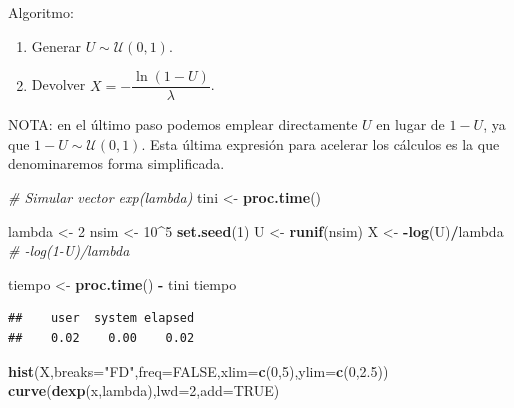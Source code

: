 \documentclass[]{book}
\newenvironment{Shaded}{\begin{snugshade}}{\end{snugshade}}
\newcommand{\KeywordTok}[1]{\textcolor[rgb]{0.13,0.29,0.53}{\textbf{#1}}}
\newcommand{\DataTypeTok}[1]{\textcolor[rgb]{0.13,0.29,0.53}{#1}}
\newcommand{\DecValTok}[1]{\textcolor[rgb]{0.00,0.00,0.81}{#1}}
\newcommand{\FloatTok}[1]{\textcolor[rgb]{0.00,0.00,0.81}{#1}}
\newcommand{\StringTok}[1]{\textcolor[rgb]{0.31,0.60,0.02}{#1}}
\newcommand{\CommentTok}[1]{\textcolor[rgb]{0.56,0.35,0.01}{\textit{#1}}}
\newcommand{\OtherTok}[1]{\textcolor[rgb]{0.56,0.35,0.01}{#1}}
\newcommand{\OperatorTok}[1]{\textcolor[rgb]{0.81,0.36,0.00}{\textbf{#1}}}
\newcommand{\NormalTok}[1]{#1}
\theoremstyle{definition}
\theoremstyle{definition}
\theoremstyle{definition}
\theoremstyle{remark}
\begin{document}
Algoritmo:

\begin{enumerate}
\def\labelenumi{\arabic{enumi}.}
\item
  Generar \(U\sim \mathcal{U}\left( 0,1\right)\).
\item
  Devolver \(X=-\dfrac{\ln \left( 1-U\right) }{\lambda }\).
\end{enumerate}

NOTA: en el último paso podemos emplear directamente \(U\) en lugar de
\(1-U\), ya que \(1 - U\sim \mathcal{U}\left( 0,1\right)\). Esta última
expresión para acelerar los cálculos es la que denominaremos forma
simplificada.

\begin{Shaded}
\begin{Highlighting}[]
\CommentTok{# Simular vector exp(lambda)}
\NormalTok{tini <-}\StringTok{ }\KeywordTok{proc.time}\NormalTok{()}

\NormalTok{lambda <-}\StringTok{ }\DecValTok{2}
\NormalTok{nsim <-}\StringTok{ }\DecValTok{10}\OperatorTok{^}\DecValTok{5}
\KeywordTok{set.seed}\NormalTok{(}\DecValTok{1}\NormalTok{)}
\NormalTok{U <-}\StringTok{ }\KeywordTok{runif}\NormalTok{(nsim)}
\NormalTok{X <-}\StringTok{ }\OperatorTok{-}\KeywordTok{log}\NormalTok{(U)}\OperatorTok{/}\NormalTok{lambda }\CommentTok{# -log(1-U)/lambda}

\NormalTok{tiempo <-}\StringTok{ }\KeywordTok{proc.time}\NormalTok{() }\OperatorTok{-}\StringTok{ }\NormalTok{tini}
\NormalTok{tiempo}
\end{Highlighting}
\end{Shaded}

\begin{verbatim}
##    user  system elapsed 
##    0.02    0.00    0.02
\end{verbatim}

\begin{Shaded}
\begin{Highlighting}[]
\KeywordTok{hist}\NormalTok{(X,}\DataTypeTok{breaks=}\StringTok{"FD"}\NormalTok{,}\DataTypeTok{freq=}\OtherTok{FALSE}\NormalTok{,}\DataTypeTok{xlim=}\KeywordTok{c}\NormalTok{(}\DecValTok{0}\NormalTok{,}\DecValTok{5}\NormalTok{),}\DataTypeTok{ylim=}\KeywordTok{c}\NormalTok{(}\DecValTok{0}\NormalTok{,}\FloatTok{2.5}\NormalTok{))}
\KeywordTok{curve}\NormalTok{(}\KeywordTok{dexp}\NormalTok{(x,lambda),}\DataTypeTok{lwd=}\DecValTok{2}\NormalTok{,}\DataTypeTok{add=}\OtherTok{TRUE}\NormalTok{)}
\end{Highlighting}
\end{Shaded}
\end{document}
